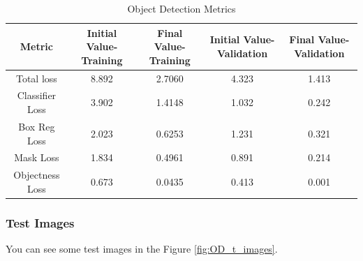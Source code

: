 \documentclass[a4paper, openany]{book}
\begin{document}
\begin{table}[htp]
\caption{Object Detection Metrics}
\begin{center}
\begin{tabular}{c | c | c | c | c}
Metric & Initial Value-Training & Final Value-Training& Initial Value-Validation & Final Value-Validation\\
\hline
Total loss &8.892 & 2.7060 & 4.323 & 1.413\\
Classifier Loss & 3.902 & 1.4148 & 1.032 & 0.242\\
Box Reg Loss& 2.023 & 0.6253 & 1.231 & 0.321\\
Mask Loss & 1.834 & 0.4961 & 0.891 & 0.214\\
Objectness Loss& 0.673 & 0.0435 & 0.413 & 0.001
\end{tabular}
\end{center}
\label{table:OD_Metrics}
\end{table}%


\newpage

\subsubsection{Test Images}
	\vspace{0.3cm}
	
You can see some test images in the Figure \ref{fig:OD_t_images}.
\end{document}
